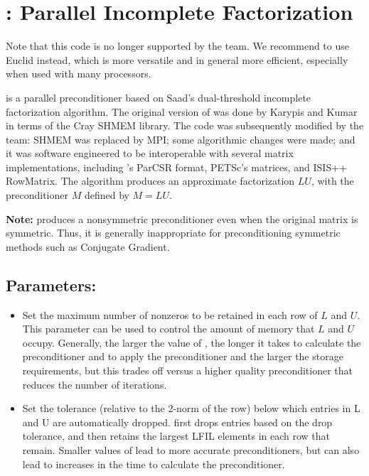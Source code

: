 
\section{\pilut: Parallel Incomplete Factorization}
\label{PILUT}

Note that this code is no longer supported by the \hypre{} team. We recommend to 
use Euclid instead, which is more versatile and in general more efficient, especially
when used with many processors.

\pilut{} is a parallel preconditioner based on Saad's dual-threshold incomplete
factorization algorithm. The original version of \pilut{} was done by Karypis
and Kumar \cite{GKarypis_VKumar_1998} in terms of the Cray SHMEM library. The
code was subsequently modified by the \hypre{} team: SHMEM was replaced by MPI;
some algorithmic changes were made; and it was software engineered to be
interoperable with several matrix implementations, including \hypre{}'s ParCSR
format, PETSc's matrices, and ISIS++ RowMatrix. The algorithm produces an
approximate factorization $ L U$, with the preconditioner $M$ defined by $ M =
L U $.

{\bf Note:} \pilut{} produces a nonsymmetric preconditioner even when the
original matrix is symmetric. Thus, it is generally inappropriate for
preconditioning symmetric methods such as Conjugate Gradient.


\subsection*{Parameters:}

\begin{itemize}

\item
{}
Set the maximum number of nonzeros to be retained in each row of $L$ and $U$.
This parameter can be used to control the amount of memory that $L$ and $U$
occupy. Generally, the larger the value of , the longer it takes to
calculate the preconditioner and to apply the preconditioner and the larger
the storage requirements, but this trades
off versus a higher quality preconditioner that reduces the number of
iterations.

\item
{}
Set the tolerance (relative to the 2-norm of the row) below which entries in L
and U are automatically dropped. \pilut{} first drops entries based on the drop
tolerance, and then retains the largest LFIL elements in each row that remain.
Smaller values of  lead to more accurate preconditioners, but can
also lead to increases in the time to calculate the preconditioner.

\end{itemize}
